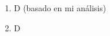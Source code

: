 \documentclass[12pt, a4paper]{article}
\newcommand{\respitem}[1]{\item[\textbf{#1.}]} %
\begin{document}
\begin{enumerate}
    \respitem{21} D (basado en mi análisis)
    \respitem{22} D %

\end{enumerate}
\end{document}
